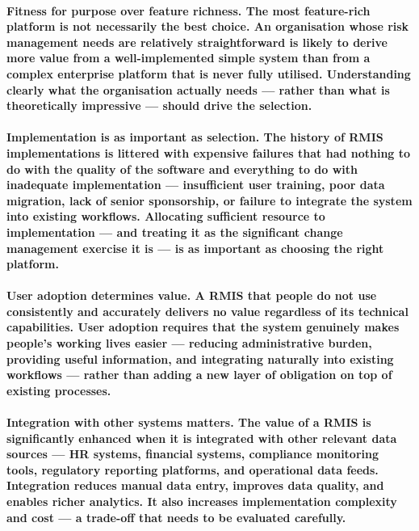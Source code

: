 \paragraph{\textbf{Fitness for purpose over feature richness}. The most feature-rich platform is not necessarily the best choice. An organisation whose risk management needs are relatively straightforward is likely to derive more value from a well-implemented simple system than from a complex enterprise platform that is never fully utilised. Understanding clearly what the organisation actually needs — rather than what is theoretically impressive — should drive the selection.}
\paragraph{\textbf{Implementation is as important as selection}. The history of RMIS implementations is littered with expensive failures that had nothing to do with the quality of the software and everything to do with inadequate implementation — insufficient user training, poor data migration, lack of senior sponsorship, or failure to integrate the system into existing workflows. Allocating sufficient resource to implementation — and treating it as the significant change management exercise it is — is as important as choosing the right platform.}
\paragraph{\textbf{User adoption determines value}. A RMIS that people do not use consistently and accurately delivers no value regardless of its technical capabilities. User adoption requires that the system genuinely makes people's working lives easier — reducing administrative burden, providing useful information, and integrating naturally into existing workflows — rather than adding a new layer of obligation on top of existing processes.}
\paragraph{\textbf{Integration with other systems matters}. The value of a RMIS is significantly enhanced when it is integrated with other relevant data sources — HR systems, financial systems, compliance monitoring tools, regulatory reporting platforms, and operational data feeds. Integration reduces manual data entry, improves data quality, and enables richer analytics. It also increases implementation complexity and cost — a trade-off that needs to be evaluated carefully.}
